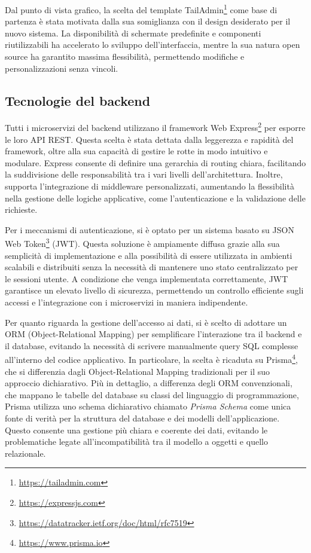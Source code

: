 Dal punto di vista grafico, la scelta del template TailAdmin\footnote{\url{https://tailadmin.com}} come base di partenza è stata motivata dalla sua somiglianza con il design desiderato per il nuovo sistema. La disponibilità di schermate predefinite e componenti riutilizzabili ha accelerato lo sviluppo dell’interfaccia, mentre la sua natura open source ha garantito massima flessibilità, permettendo modifiche e personalizzazioni senza vincoli.

\subsection{Tecnologie del backend}
Tutti i microservizi del backend utilizzano il framework Web Express\footnote{\url{https://expressjs.com}} per esporre le loro API REST. Questa scelta è stata dettata dalla leggerezza e rapidità del framework, oltre alla sua capacità di gestire le rotte in modo intuitivo e modulare. Express consente di definire una gerarchia di routing chiara, facilitando la suddivisione delle responsabilità tra i vari livelli dell'architettura. Inoltre, supporta l'integrazione di middleware personalizzati, aumentando la flessibilità nella gestione delle logiche applicative, come l'autenticazione e la validazione delle richieste.

Per i meccanismi di autenticazione, si è optato per un sistema basato su JSON Web Token\footnote{\url{https://datatracker.ietf.org/doc/html/rfc7519}} (JWT). Questa soluzione è ampiamente diffusa grazie alla sua semplicità di implementazione e alla possibilità di essere utilizzata in ambienti scalabili e distribuiti senza la necessità di mantenere uno stato centralizzato per le sessioni utente. A condizione che venga implementata correttamente, JWT garantisce un elevato livello di sicurezza, permettendo un controllo efficiente sugli accessi e l'integrazione con i microservizi in maniera indipendente.

Per quanto riguarda la gestione dell’accesso ai dati, si è scelto di adottare un ORM (Object-Relational Mapping) per semplificare l’interazione tra il backend e il database, evitando la necessità di scrivere manualmente query SQL complesse all’interno del codice applicativo. In particolare, la scelta è ricaduta su Prisma\footnote{\url{https://www.prisma.io}}, che si differenzia dagli Object-Relational Mapping tradizionali per il suo approccio dichiarativo. Più in dettaglio, a differenza degli ORM convenzionali, che mappano le tabelle del database su classi del linguaggio di programmazione, Prisma utilizza uno schema dichiarativo chiamato \textit{Prisma Schema} come unica fonte di verità per la struttura del database e dei modelli dell’applicazione. Questo consente una gestione più chiara e coerente dei dati, evitando le problematiche legate all'incompatibilità tra il modello a oggetti e quello relazionale.

